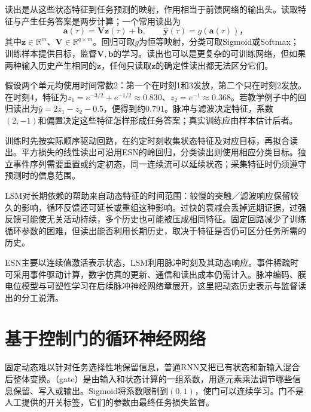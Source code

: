 读出是从这些状态特征到任务预测的映射，作用相当于前馈网络的输出头。读取特征与产生任务答案是两步计算；一个常用读出为
\begin{equation}
  \bm a(\tau)=\bm V\bm z(\tau)+\bm b,
  \qquad\widehat{\bm y}(\tau)=g(\bm a(\tau))\text{，}
  \label{eq:rnn-lsm-readout}
\end{equation}
其中$\bm z\in\mathbb R^m$、$\bm V\in\mathbb R^{q\times m}$。回归可取$g$为恒等映射，分类可取Sigmoid或Softmax；训练样本提供目标，监督$\bm V,\bm b$的学习。读出也可以是更复杂的可训练网络，但如果两种输入历史产生相同的$\bm z$，任何只读取$\bm z$的确定性读出都无法区分它们。

\begin{example}[从脉冲活动到预测]
  \label{ex:rnn-lsm-readout}
  假设两个单元均使用时间常数2：第一个在时刻1和3发放，第二个只在时刻2发放。在时刻4，特征为$z_1=e^{-3/2}+e^{-1/2}\approx0.830$、$z_2=e^{-1}\approx0.368$。若教学例子中的回归读出为$\widehat y=2z_1-z_2-0.5$，便得到约$0.791$。脉冲与滤波决定特征，系数$(2,-1)$和偏置决定这些特征怎样形成任务答案；真实训练应由样本估计后者。
\end{example}

训练时先按实际顺序驱动回路，在约定时刻收集状态特征及对应目标，再拟合读出。平方损失的线性读出可沿用ESN的岭回归，分类读出则使用相应分类目标。独立事件序列需要重置或约定初态，同一连续流可以延续状态；采集特征时仍须遵守预测时的信息范围。

LSM对长期依赖的帮助来自动态特征的时间范围：较慢的突触／滤波响应保留较久的影响，循环反馈还可延长或重组这种影响。过快的衰减会丢掉远期证据，过强反馈可能使无关活动持续，多个历史也可能被压成相同特征。固定回路减少了训练循环参数的困难，但读出能否利用长期历史，取决于特征是否仍可区分任务所需的历史。

ESN主要以连续值激活表示状态，LSM利用脉冲时刻及其动态响应。事件稀疏时可采用事件驱动计算，数字仿真的更新、通信和读出成本仍需计入。脉冲编码、膜电位模型与可塑性学习在后续脉冲神经网络章展开，这里把动态历史表示与监督读出的分工说清。

\section{基于控制门的循环神经网络}
\label{sec:rnn-gated}

固定动态难以针对任务选择性地保留信息，普通RNN又把已有状态和新输入混合后整体变换。（gate）是由输入和状态计算的一组系数，用逐元素乘法调节哪些信息保留、写入或输出。Sigmoid将系数限制到$(0,1)$，使门可以连续学习。门不是人工提供的开关标签，它们的参数由最终任务损失监督。

